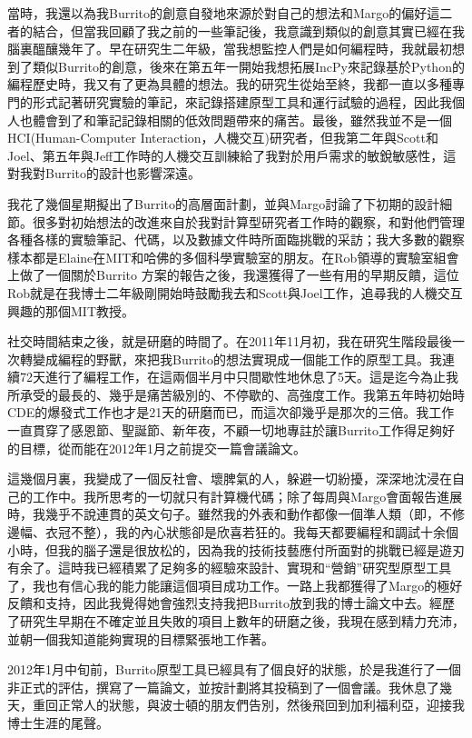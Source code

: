 \documentclass[12pt,UTF8,nofonts]{book}
\begin{document}
當時，我還以為我Burrito的創意自發地來源於對自己的想法和Margo的偏好這二者的結合，但當我回顧了我之前的一些筆記後，我意識到類似的創意其實已經在我腦裏醞釀幾年了。早在研究生二年級，當我想監控人們是如何編程時，我就最初想到了類似Burrito的創意，後來在第五年一開始我想拓展IncPy來記錄基於Python的編程歷史時，我又有了更為具體的想法。我的研究生從始至終，我都一直以多種專門的形式記著研究實驗的筆記，來記錄搭建原型工具和運行試驗的過程，因此我個人也體會到了和筆記記錄相關的低效問題帶來的痛苦。最後，雖然我並不是一個HCI(Human-Computer Interaction，人機交互)研究者，但我第二年與Scott和Joel、第五年與Jeff工作時的人機交互訓練給了我對於用戶需求的敏銳敏感性，這對我對Burrito的設計也影響深遠。

我花了幾個星期擬出了Burrito的高層面計劃，並與Margo討論了下初期的設計細節。很多對初始想法的改進來自於我對計算型研究者工作時的觀察，和對他們管理各種各樣的實驗筆記、代碼，以及數據文件時所面臨挑戰的采訪；我大多數的觀察樣本都是Elaine在MIT和哈佛的多個科學實驗室的朋友。在Rob領導的實驗室組會上做了一個關於Burrito 方案的報告之後，我還獲得了一些有用的早期反饋，這位Rob就是在我博士二年級剛開始時鼓勵我去和Scott與Joel工作，追尋我的人機交互興趣的那個MIT教授。

\breakline

社交時間結束之後，就是研磨的時間了。在2011年11月初，我在研究生階段最後一次轉變成編程的野獸，來把我Burrito的想法實現成一個能工作的原型工具。我連續72天進行了編程工作，在這兩個半月中只間歇性地休息了5天。這是迄今為止我所承受的最長的、幾乎是痛苦級別的、不停歇的、高強度工作。我第五年時初始時CDE的爆發式工作也才是21天的研磨而已，而這次卻幾乎是那次的三倍。我工作一直貫穿了感恩節、聖誕節、新年夜，不顧一切地專註於讓Burrito工作得足夠好的目標，從而能在2012年1月之前提交一篇會議論文。

這幾個月裏，我變成了一個反社會、壞脾氣的人，躲避一切紛擾，深深地沈浸在自己的工作中。我所思考的一切就只有計算機代碼；除了每周與Margo會面報告進展時，我幾乎不說連貫的英文句子。雖然我的外表和動作都像一個準人類（即，不修邊幅、衣冠不整），我的內心狀態卻是欣喜若狂的。我每天都要編程和調試十余個小時，但我的腦子還是很放松的，因為我的技術技藝應付所面對的挑戰已經是遊刃有余了。這時我已經積累了足夠多的經驗來設計、實現和“營銷”研究型原型工具了，我也有信心我的能力能讓這個項目成功工作。一路上我都獲得了Margo的極好反饋和支持，因此我覺得她會強烈支持我把Burrito放到我的博士論文中去。經歷了研究生早期在不確定並且失敗的項目上數年的研磨之後，我現在感到精力充沛，並朝一個我知道能夠實現的目標緊張地工作著。

2012年1月中旬前，Burrito原型工具已經具有了個良好的狀態，於是我進行了一個非正式的評估，撰寫了一篇論文，並按計劃將其投稿到了一個會議。我休息了幾天，重回正常人的狀態，與波士頓的朋友們告別，然後飛回到加利福利亞，迎接我博士生涯的尾聲。
\end{document}
